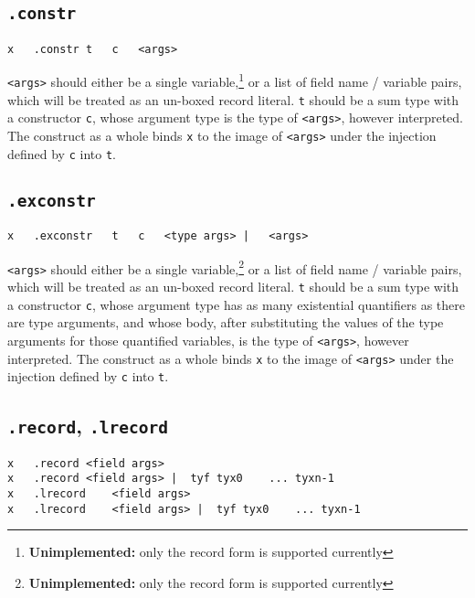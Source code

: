 \documentclass{report}
\newcommand\stringcode[1]{\texttt{#1}}
\newcommand\unimpl[1]{\footnote{\textbf{Unimplemented: }#1}}
\begin{document}
\subsection{\stringcode{.constr}}

\begin{verbatim}
x	.constr	t	c	<args>
\end{verbatim}

\stringcode{<args>} should either be a single variable,\unimpl{only the record form is supported currently}
or a list of field name / variable pairs, which will be treated as an un-boxed record literal.
\stringcode{t} should be a sum type with a constructor \stringcode{c},
whose argument type is the type of \stringcode{<args>}, however interpreted.
The construct as a whole binds \stringcode{x} to the image of \stringcode{<args>} under the injection defined by \stringcode{c} into \stringcode{t}.

\subsection{\stringcode{.exconstr}}

\begin{verbatim}
x	.exconstr	t	c	<type args> |	<args>
\end{verbatim}

\stringcode{<args>} should either be a single variable,\unimpl{only the record form is supported currently}
or a list of field name / variable pairs, which will be treated as an un-boxed record literal.
\stringcode{t} should be a sum type with a constructor \stringcode{c},
whose argument type has as many existential quantifiers as there are type arguments,
and whose body, after substituting the values of the type arguments for those quantified variables,
is the type of \stringcode{<args>}, however interpreted.
The construct as a whole binds \stringcode{x} to the image of \stringcode{<args>} under the injection defined by \stringcode{c} into \stringcode{t}.

\subsection{\stringcode{.record}, \stringcode{.lrecord}}

\begin{verbatim}
x	.record	<field args>
x	.record	<field args> |	tyf	tyx0	...	tyxn-1
x	.lrecord	<field args>
x	.lrecord	<field args> |	tyf	tyx0	...	tyxn-1
\end{verbatim}
\end{document}
